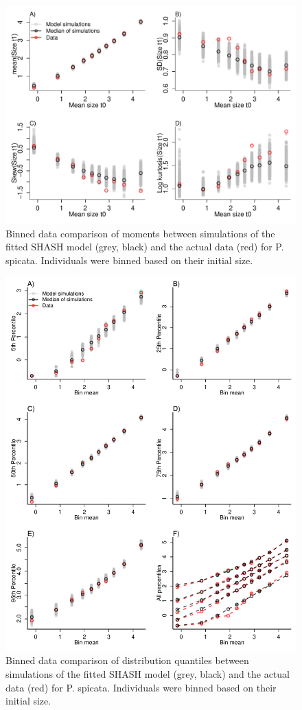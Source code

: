 \documentclass[11pt]{article}
\begin{document}
{\begin{enumerate}
\begin{figure}[tbp]
\centering
\includegraphics[width=.9\textwidth]{figures/BinnedConditionalMoments.pdf}
\caption{Binned data comparison of moments between simulations of the fitted SHASH model (grey, black) and the actual data (red) for 
{P. spicata}. Individuals were binned based on their initial size. }
\label{fig:BinnedConditionalMoments}
\end{figure} 

\begin{figure}[tbp]
\centering
\includegraphics[width=.9\textwidth]{figures/BinnedConditionalQuantiles.pdf}
\caption{Binned data comparison of distribution quantiles between simulations of the fitted SHASH model (grey, black) and the actual data (red) for 
{P. spicata}. Individuals were binned based on their initial size. }
\label{fig:BinnedConditionalQuantiles}
\end{figure} 


\end{enumerate}}
\end{document}

